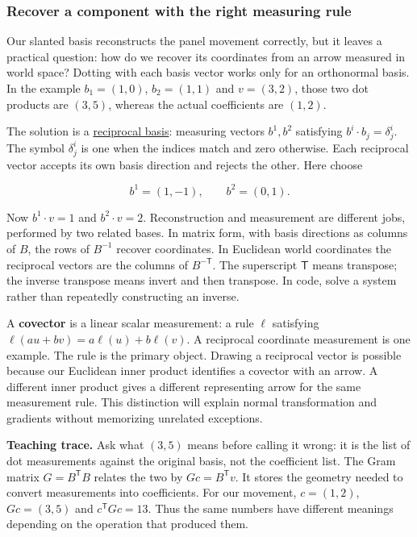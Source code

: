 \subsubsection{Recover a component with the right measuring rule}\label{01-foundations-i-ch017-recover-a-component-with-the-right-measuring-rule}

\hypertarget{01-foundations-i-ch017-recover-a-component-with-the-right-measuring-rule}{}

Our slanted basis reconstructs the panel movement correctly, but it leaves a practical question: how do we recover its coordinates from an arrow measured in world space? Dotting with each basis vector works only for an orthonormal basis. In the example \(b_1=(1,0)\), \(b_2=(1,1)\) and \(v=(3,2)\), those two dot products are \((3,5)\), whereas the actual coefficients are \((1,2)\).

The solution is a \hyperref[appendix-6b3d696dd902]{reciprocal basis}: measuring vectors \(b^1,b^2\) satisfying \(b^i\cdot b_j=\delta^i_j\). The symbol \(\delta^i_j\) is one when the indices match and zero otherwise. Each reciprocal vector accepts its own basis direction and rejects the other. Here choose

\[
b^1=(1,-1),\qquad b^2=(0,1).
\]

Now \(b^1\cdot v=1\) and \(b^2\cdot v=2\). Reconstruction and measurement are different jobs, performed by two related bases. In matrix form, with basis directions as columns of \(B\), the rows of \(B^{-1}\) recover coordinates. In Euclidean world coordinates the reciprocal vectors are the columns of \(B^{-\mathsf T}\). The superscript \(\mathsf T\) means transpose; the inverse transpose means invert and then transpose. In code, solve a system rather than repeatedly constructing an inverse.

A \textbf{covector} is a linear scalar measurement: a rule \(\ell\) satisfying \(\ell(au+bv)=a\ell(u)+b\ell(v)\). A reciprocal coordinate measurement is one example. The rule is the primary object. Drawing a reciprocal vector is possible because our Euclidean inner product identifies a covector with an arrow. A different inner product gives a different representing arrow for the same measurement rule. This distinction will explain normal transformation and gradients without memorizing unrelated exceptions.

\textbf{Teaching trace.} Ask what \((3,5)\) means before calling it wrong: it is the list of dot measurements against the original basis, not the coefficient list. The Gram matrix \(G=B^{\mathsf T}B\) relates the two by \(Gc=B^{\mathsf T}v\). It stores the geometry needed to convert measurements into coefficients. For our movement, \(c=(1,2)\), \(Gc=(3,5)\) and \(c^{\mathsf T}Gc=13\). Thus the same numbers have different meanings depending on the operation that produced them.

